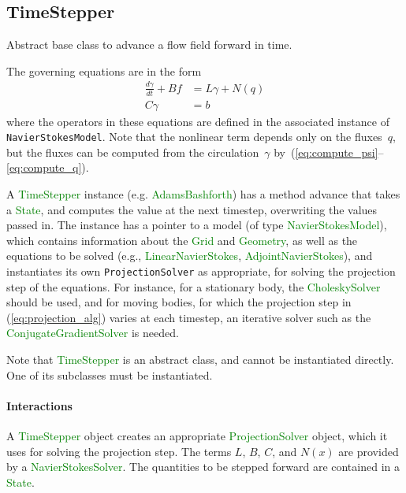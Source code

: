 \documentclass[11pt]{article}
\def\class#1{\textcolor{green}{\ttfamily\small #1}} %
\def\fn#1{{\ttfamily\small #1}} %
\let\code\lstinline
\begin{document}
\subsection{TimeStepper}
Abstract base class to advance a flow field forward in time.

The governing equations are in the form
\begin{equation}
\begin{aligned}
\frac{d\gamma}{dt} + Bf &= L\gamma + N(q)\\
C\gamma &= b
\end{aligned}
\label{eq:model}
\end{equation}
where the operators in these equations are defined in the associated instance of \code|NavierStokesModel|.  Note that the nonlinear term depends only on the fluxes~$q$, but the fluxes can be computed from the circulation~$\gamma$ by~(\ref{eq:compute_psi}--\ref{eq:compute_q}).

A \class{TimeStepper} instance (e.g. \class{AdamsBashforth}) has a method \fn{advance} that takes a \class{State}, and computes the value at the next timestep, overwriting the values passed in.  The instance has a pointer to a model (of type \class{NavierStokesModel}), which contains information about the \class{Grid} and \class{Geometry}, as well as the equations to be solved (e.g., \class{LinearNavierStokes}, \class{AdjointNavierStokes}), and instantiates its own \code|ProjectionSolver| as appropriate, for solving the projection step of the equations.  For instance, for a stationary body, the \class{CholeskySolver} should be used, and for moving bodies, for which the projection step in (\ref{eq:projection_alg}) varies at each timestep, an iterative solver such as the \class{ConjugateGradientSolver} is needed.

Note that \class{TimeStepper} is an abstract class, and cannot be instantiated directly.  One of its subclasses must be instantiated.

\paragraph{Interactions}
A \class{TimeStepper} object creates an appropriate \class{ProjectionSolver} object, which it uses for solving the projection step.  The terms $L$, $B$, $C$, and $N(x)$ are provided by a \class{NavierStokesSolver}.  The quantities to be stepped forward are contained in a \class{State}.
\end{document}
